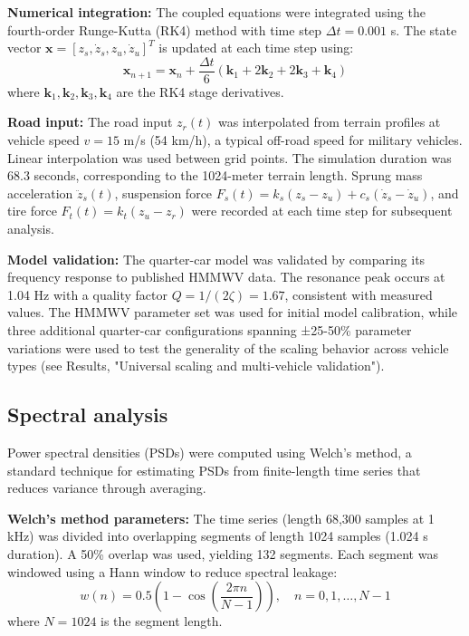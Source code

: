 \documentclass[11pt]{article}
\begin{document}
\textbf{Numerical integration:} The coupled equations were integrated using the fourth-order Runge-Kutta (RK4) method with time step $\Delta t = 0.001$ s. The state vector $\mathbf{x} = [z_s, \dot{z}_s, z_u, \dot{z}_u]^T$ is updated at each time step using:
\begin{equation}
\mathbf{x}_{n+1} = \mathbf{x}_n + \frac{\Delta t}{6}(\mathbf{k}_1 + 2\mathbf{k}_2 + 2\mathbf{k}_3 + \mathbf{k}_4)
\end{equation}
where $\mathbf{k}_1, \mathbf{k}_2, \mathbf{k}_3, \mathbf{k}_4$ are the RK4 stage derivatives.

\textbf{Road input:} The road input $z_r(t)$ was interpolated from terrain profiles at vehicle speed $v = 15$ m/s (54 km/h), a typical off-road speed for military vehicles. Linear interpolation was used between grid points. The simulation duration was 68.3 seconds, corresponding to the 1024-meter terrain length. Sprung mass acceleration $\ddot{z}_s(t)$, suspension force $F_s(t) = k_s(z_s - z_u) + c_s(\dot{z}_s - \dot{z}_u)$, and tire force $F_t(t) = k_t(z_u - z_r)$ were recorded at each time step for subsequent analysis.

\textbf{Model validation:} The quarter-car model was validated by comparing its frequency response to published HMMWV data. The resonance peak occurs at 1.04 Hz with a quality factor $Q = 1/(2\zeta) = 1.67$, consistent with measured values. The HMMWV parameter set was used for initial model calibration, while three additional quarter-car configurations spanning ±25-50\% parameter variations were used to test the generality of the scaling behavior across vehicle types (see Results, "Universal scaling and multi-vehicle validation").

\subsection*{Spectral analysis}

Power spectral densities (PSDs) were computed using Welch's method\cite{Welch1967}, a standard technique for estimating PSDs from finite-length time series that reduces variance through averaging.

\textbf{Welch's method parameters:} The time series (length 68,300 samples at 1 kHz) was divided into overlapping segments of length 1024 samples (1.024 s duration). A 50\% overlap was used, yielding 132 segments. Each segment was windowed using a Hann window to reduce spectral leakage:
\begin{equation}
w(n) = 0.5\left(1 - \cos\left(\frac{2\pi n}{N-1}\right)\right), \quad n = 0, 1, \ldots, N-1
\end{equation}
where $N = 1024$ is the segment length.
\end{document}
